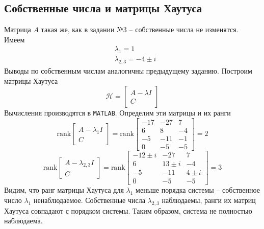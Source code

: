 \documentclass[a4paper, 12pt]{article}
\begin{document}
    \subsection{Собственные числа и матрицы Хаутуса}
    Матрица $A$ такая же, как в задании №3 -- собственные числа не изменятся. Имеем
    \begin{align*}
        &\lambda_1=1\\
        &\lambda_{2,3}=-4\pm i
    \end{align*}
    Выводы по собственным числам аналогичны предыдущему заданию. Построим матрицы Хаутуса
    $$
    \mathcal{H}=\begin{bmatrix}
        A-\lambda I\\
        C
    \end{bmatrix}
    $$
    Вычисления производятся в \texttt{MATLAB}. Определим эти матрицы и их ранги
    $$
    \text{rank}\begin{bmatrix}
        A-\lambda_1 I\\
        C
    \end{bmatrix}=\text{rank}\begin{bmatrix}
    -17  &-27    &7\\
    6    &8   &-4\\
   -5  &-11   &-1\\
    0   &-5   &-5
    \end{bmatrix}=2
    $$
    $$
    \text{rank}\begin{bmatrix}
        A-\lambda_{2,3} I\\
        C
    \end{bmatrix}=\text{rank}\begin{bmatrix}
        -12\pm i  &-27    &7\\
        6    &13\pm i   &-4\\
       -5  &-11   &4\pm i\\
        0   &-5   &-5
    \end{bmatrix}=3
    $$
    Видим, что ранг матрицы Хаутуса для $\lambda_1$ меньше порядка системы -- собственное число $\lambda_1$ ненаблюдаемое.
    Собственные числа $\lambda_{2,3}$ наблюдаемы, ранги их матриц Хаутуса совпадают с порядком системы. Таким образом, система не полностью наблюдаема.
\end{document}
